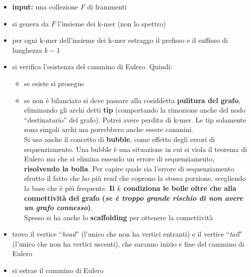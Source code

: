 \documentclass[a4paper,12pt, oneside]{book}
\begin{document}
\begin{itemize}
  \item \textbf{input:} una collezione $F$ di frammenti
  \item si genera da $F$ l'insieme dei k-mer (non lo spettro)
  \item per ogni k-mer dell'insieme dei k-mer estraggo il prefisso e il suffisso
  di lunghezza $k-1$
  \item si verifica l'esistenza del cammino di Eulero. Quindi:
  \begin{itemize}
    \item se esiste si prosegue
    \item se non è bilanciato si deve passare alla cosiddetta \textbf{pulitura
      del grafo}, eliminando gli archi detti \textbf{tip} (comportando la
    rimozione anche del nodo ``destinatario'' del grafo). Potrei avere perdita
    di k-mer. Le tip solamente sono singoli archi ma porrebbero anche essere
    cammini.\\
    Si usa anche il concetto di \textbf{bubble}, come effetto degli
    errori di sequenziamento. Una bubble è una situazione in cui si viola il
    teorema di Eulero ma che si elimina essendo un errore di sequenziamento,
    \textbf{risolvendo la bolla}. Per capire quale sia l'errore di
    sequenziamento sfrutto il fatto che ho più read che coprono la stessa
    porzione, scegliendo la base che è più frequente. \textbf{Il $k$ condiziona
      le bolle oltre che alla connettività del grafo (\textit{se è troppo grande
        rischio di non avere un grafo connesso})}.\\
    Spesso si ha anche lo \textbf{scaffolding} per ottenere la connettività
  \end{itemize}
  \item trovo il vertice ``\textit{head}'' (l'unico che non ha vertici entranti)
  e il vertice ``\textit{tail}'' (l'unico che non ha vertici uscenti), che
  saranno inizio e fine del cammino di Eulero
  \item si estrae il cammino di Eulero
\end{itemize}
\end{document}
